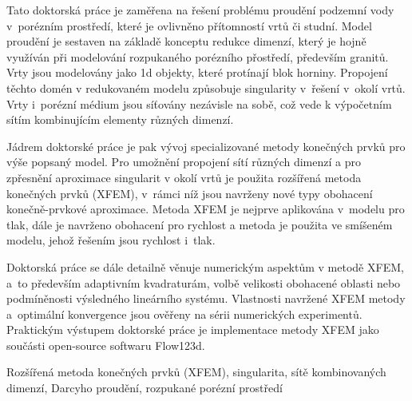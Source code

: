 \documentclass[bibliography=totocnumbered,dvipsnames,FM,Dis, EN]{tulthesis_autoreferat}
\begin{document}


\begin{abstractCZ}
Tato doktorská práce je zaměřena na řešení problému proudění podzemní vody v~porézním prostředí, které
je ovlivněno přítomností vrtů či studní. Model proudění je sestaven na základě konceptu redukce dimenzí,
který je hojně využíván při modelování rozpukaného porézního přostředí, především granitů.
Vrty jsou modelovány jako 1d objekty, které protínají blok horniny. 
Propojení těchto domén v redukovaném modelu způsobuje singularity v~řešení v~okolí vrtů.
Vrty i~porézní médium jsou síťovány nezávisle na sobě, což vede k výpočetním sítím kombinujícím elementy
různých dimenzí.

Jádrem doktorské práce je pak vývoj specializované metody konečných prvků pro výše popsaný model. 
Pro umožnění propojení sítí různých dimenzí a pro zpřesnění aproximace singularit v okolí vrtů je 
použita rozšířená metoda konečných prvků (XFEM), v~rámci níž jsou navrženy nové typy obohacení
konečně-prvkové aproximace.
Metoda XFEM je nejprve aplikována v~modelu pro tlak, dále je navrženo obohacení pro rychlost a metoda
je použita ve smíšeném modelu, jehož řešením jsou rychlost i~tlak.

Doktorská práce se dále detailně věnuje numerickým aspektům v metodě XFEM, a~to především 
adaptivním kvadraturám, volbě velikosti obohacené oblasti nebo podmíněnosti výsledného lineárního systému.
Vlastnosti navržené XFEM metody a~optimální konvergence jsou ověřeny na sérii numerických experimentů.
Praktickým výstupem doktorské práce je implementace metody XFEM jako součásti open-source softwaru Flow123d.

\end{abstractCZ}

\begin{keywordsCZ}
Rozšířená metoda konečných prvků (XFEM), singularita, sítě kombinovaných dimenzí,
Darcyho proudění, rozpukané porézní prostředí
\end{keywordsCZ}

\vspace{2cm}
\end{document}
